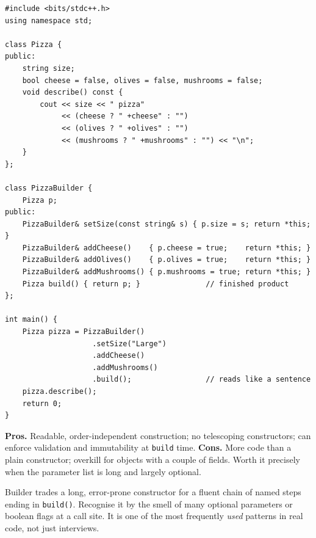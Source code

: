 \begin{lstlisting}
#include <bits/stdc++.h>
using namespace std;

class Pizza {
public:
    string size;
    bool cheese = false, olives = false, mushrooms = false;
    void describe() const {
        cout << size << " pizza"
             << (cheese ? " +cheese" : "")
             << (olives ? " +olives" : "")
             << (mushrooms ? " +mushrooms" : "") << "\n";
    }
};

class PizzaBuilder {
    Pizza p;
public:
    PizzaBuilder& setSize(const string& s) { p.size = s; return *this; }
    PizzaBuilder& addCheese()    { p.cheese = true;    return *this; }
    PizzaBuilder& addOlives()    { p.olives = true;    return *this; }
    PizzaBuilder& addMushrooms() { p.mushrooms = true; return *this; }
    Pizza build() { return p; }               // finished product
};

int main() {
    Pizza pizza = PizzaBuilder()
                    .setSize("Large")
                    .addCheese()
                    .addMushrooms()
                    .build();                 // reads like a sentence
    pizza.describe();
    return 0;
}
\end{lstlisting}

\begin{complexitybox}
\textbf{Pros.} Readable, order-independent construction; no telescoping
constructors; can enforce validation and immutability at \texttt{build}
time. \textbf{Cons.} More code than a plain constructor; overkill for
objects with a couple of fields. Worth it precisely when the parameter
list is long and largely optional.
\end{complexitybox}

\begin{takeawaybox}
Builder trades a long, error-prone constructor for a fluent chain of named
steps ending in \texttt{build()}. Recognise it by the smell of many
optional parameters or boolean flags at a call site. It is one of the most
frequently \emph{used} patterns in real code, not just interviews.
\end{takeawaybox}
